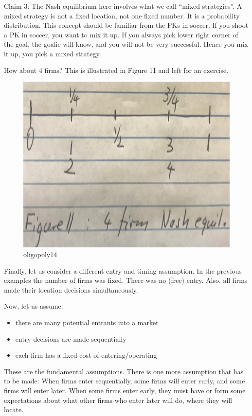 \documentclass[
]{book}
\providecommand{\tightlist}{%
  \setlength{\itemsep}{0pt}\setlength{\parskip}{0pt}}
\begin{document}
Claim 3: The Nash equilibrium here involves what we call ``mixed strategies''. A mixed strategy is not a fixed location, not one fixed number. It is a probability distribution. This concept should be familiar from the PKs in soccer. If you shoot a PK in soccer, you want to mix it up. If you always pick lower right corner of the goal, the goalie will know, and you will not be very successful. Hence you mix it up, you pick a mixed strategy.

How about 4 firms? This is illustrated in Figure 11 and left for an exercise.

\begin{figure}

{\centering \includegraphics[width=0.5\linewidth]{img/oligopoly/fig14} 

}

\caption{oligopoly14}\label{fig:oligopoly14}
\end{figure}

Finally, let us consider a different entry and timing assumption. In the previous examples the number of firms was fixed. There was no (free) entry. Also, all firms made their location decisions simultaneously.

Now, let us assume:

\begin{itemize}
\tightlist
\item
  there are many potential entrants into a market
\item
  entry decisions are made sequentially
\item
  each firm has a fixed cost of entering/operating
\end{itemize}

These are the fundamental assumptions. There is one more assumption that has to be made: When firms enter sequentially, some firms will enter early, and some firms will enter later. When some firms enter early, they must have or form some expectations about what other firms who enter later will do, where they will locate.
\end{document}
